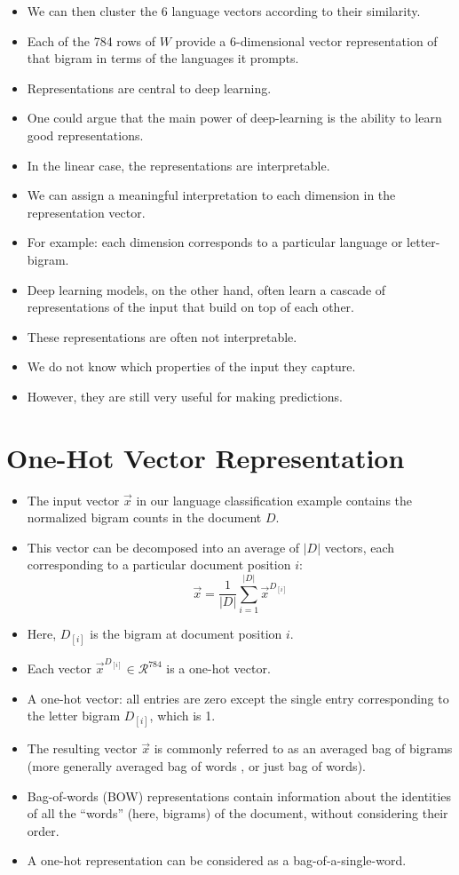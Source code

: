 \begin{itemize}
\item We can then cluster the 6 language vectors according to their similarity.
\item Each of the 784 rows of $W$ provide a 6-dimensional vector representation of that bigram in terms of the languages it prompts.
\item Representations are central to deep learning.
\item One could argue that the main power of deep-learning is the ability to learn good representations.
\item In the linear case, the representations are interpretable.
\item We can assign a meaningful interpretation to each dimension in the
representation vector.
\item For example: each dimension corresponds to a particular language or letter-bigram.
\item Deep learning models, on the other hand,  often learn a cascade of representations of the input that build on top of each other. 
\item These representations are often not interpretable.
\item We do not know which properties of the input they capture.
\item However, they are still very useful for making predictions.
\end{itemize}


\section{One-Hot Vector Representation}
\begin{itemize}
\item The input vector $\vec{x}$ in our language classification example contains the normalized bigram counts in the document $D$.
\item This vector can be decomposed into an average of $|D|$ vectors, each corresponding to a particular document position $i$:
\begin{equation}
 \vec{x} = \frac{1}{|D|} \sum_{i=1}^{|D|} \vec{x}^{D_{[i]}}
\end{equation}
\item Here, $D_{[i]}$ is the bigram at document position $i$.
\item Each vector  $\vec{x}^{D_{[i]}} \in \mathcal{R}^{784}$ is a one-hot vector.
\item A one-hot vector: all entries are zero except the single entry corresponding to the letter bigram $D_{[i]}$, which is 1.
\item The resulting vector $\vec{x}$ is commonly referred to as an averaged bag of bigrams (more generally averaged bag of words , or just bag of words).
\item Bag-of-words (BOW) representations contain information about the identities of all the ``words'' (here, bigrams) of the document, without considering their order.
\item A one-hot representation can be considered as a bag-of-a-single-word.
\end{itemize}

